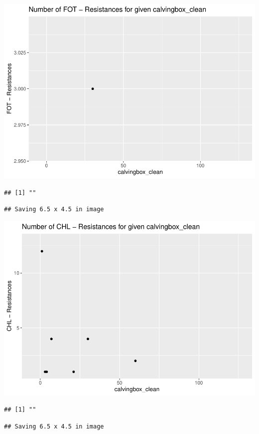 \documentclass[
]{article}
\begin{document}
\includegraphics{NResistenzen_files/figure-latex/numerical_variables-25.pdf}

\begin{verbatim}
## [1] ""
\end{verbatim}

\begin{verbatim}
## Saving 6.5 x 4.5 in image
\end{verbatim}

\includegraphics{NResistenzen_files/figure-latex/numerical_variables-26.pdf}

\begin{verbatim}
## [1] ""
\end{verbatim}

\begin{verbatim}
## Saving 6.5 x 4.5 in image
\end{verbatim}
\end{document}
